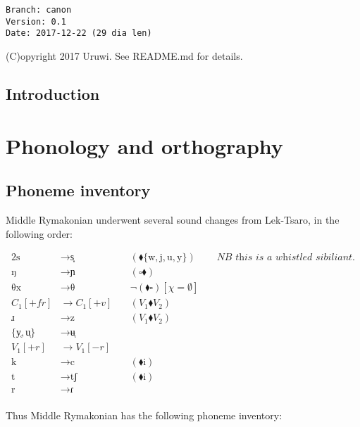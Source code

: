 \documentclass{book}
\newcommand{\lname}{Middle Rymakonian}
\begin{document}
\begin{verbatim}
Branch: canon
Version: 0.1
Date: 2017-12-22 (29 dia len)
\end{verbatim}

(C)opyright 2017 Uruwi. See README.md for details.

\tableofcontents

\section{Introduction}

\chapter{Phonology and orthography}

\section{Phoneme inventory}

\lname{} underwent several sound changes from Lek-Tsaro, in the following order:

\begin{alignat*}{2}
  \text{s} &\rightarrow \text{s͎} &\quad(\blacklozenge \{\text{w}, \text{j}, \text{u}, \text{y}\}) &\quad \textit{NB this is a whistled sibiliant.} \\
  \text{ŋ} &\rightarrow \text{ɲ} &\quad(\square \blacklozenge) \\
  \text{θx} &\rightarrow \text{θ} &\quad\lnot(\blacklozenge \square) [\chi = \emptyset] \\
  C_1[+fr] &\rightarrow C_1[+v] &\quad(V_1 \blacklozenge V_2) \\
  \text{ɹ} &\rightarrow \text{z} &\quad(V_1 \blacklozenge V_2) \\
  \{\text{y̜}, \text{u̜}\} &\rightarrow \text{ʉ̜} \\
  V_1[+r] &\rightarrow V_1[-r] \\
  \text{k} &\rightarrow \text{c} &\quad (\blacklozenge \text{i}) \\
  \text{t} &\rightarrow \text{tʃ} &\quad (\blacklozenge \text{i}) \\
  \text{r} &\rightarrow \text{ɾ} \\
\end{alignat*}

Thus \lname{} has the following phoneme inventory:
\end{document}
